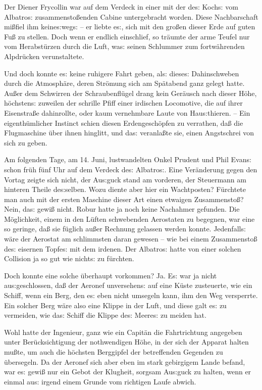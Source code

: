 \documentclass[oneside,12pt]{book}
\newcommand{\s}{s:}
\begin{document}
Der Diener Frycollin war auf dem Verdeck in einer mit der de{\s}
Koch{\s} vom {\glqq}Albatro{\s}{\grqq} zusammensto{\ss}enden Cabine
untergebracht worden. Diese Nachbarschaft mi{\ss}fiel ihm
keine{\s}weg{\s} -- er liebte e{\s}, sich mit den gro{\ss}en dieser
Erde auf guten Fu{\ss} zu stellen. Doch wenn er endlich einschlief,
so tr\"aumte der arme Teufel nur vom Herabst\"urzen durch die Luft,
wa{\s} seinen Schlummer zum fortw\"ahrenden Alpdr\"ucken
verunstaltete.

Und doch konnte e{\s} keine ruhigere Fahrt geben, al{\s} diese{\s}
Dahinschweben durch die Atmosph\"are, deren Str\"omung sich am
Sp\"atabend ganz gelegt hatte. Au{\ss}er dem Schwirren der
Schraubenfl\"ugel drang kein Ger\"ausch nach dieser H\"ohe,
h\"ochsten{\s} zuweilen der schrille Pfiff einer irdischen
Locomotive, die auf ihrer Eisenstra{\ss}e dahinrollte, oder kaum
vernehmbare Laute von Hau{\s}thieren. -- Ein eigenth\"umlicher
Instinct schien diesen Erdengesch\"opfen zu verrathen, da{\ss} die
Flugmaschine \"uber ihnen hinglitt, und da{\s} veranla{\ss}te sie,
einen Angstschrei von sich zu geben.

Am folgenden Tage, am 14. Juni, lustwandelten Onkel Prudent und Phil
Evan{\s} schon fr\"uh f\"unf Uhr auf dem Verdeck de{\s}
{\glqq}Albatro{\s}{\grqq}. Eine Ver\"anderung gegen den Vortag zeigte
sich nicht, der Au{\s}guck stand am vorderen, der Steuermann am
hinteren Theile de{\s}selben. Wozu diente aber hier ein Wachtposten?
F\"urchtete man auch mit der ersten Maschine dieser Art einen
etwaigen Zusammensto{\ss}? Nein, da{\s} gewi{\ss} nicht. Robur hatte
ja noch keine Nachahmer gefunden. Die M\"oglichkeit, einem in den
L\"uften schwebenden Aerostaten zu begegnen, war eine so geringe,
da{\ss} sie f\"uglich au{\ss}er Rechnung gelassen werden konnte.
Jedenfall{\s} w\"are der Aerostat am schlimmsten daran gewesen -- wie
bei einem Zusammensto{\ss} de{\s} eisernen Topfe{\s} mit dem irdenen.
Der {\glqq}Albatro{\s}{\grqq} hatte von einer solchen Collision ja so
gut wie nicht{\s} zu f\"urchten.

Doch konnte eine solche \"uberhaupt vorkommen? Ja. E{\s} war ja nicht
au{\s}geschlossen, da{\ss} der Aeronef unversehen{\s} auf eine
K\"uste zusteuerte, wie ein Schiff, wenn ein Berg, den e{\s} eben
nicht umsegeln kann, ihm den Weg versperrte. Ein solcher Berg w\"are
also eine Klippe in der Luft, und diese galt e{\s} zu vermeiden, wie
da{\s} Schiff die Klippe de{\s} Meere{\s} zu meiden hat.

Wohl hatte der Ingenieur, ganz wie ein Capit\"an die Fahrtrichtung
angegeben unter Ber\"uck\-sich\-tigung der nothwendigen H\"ohe, in der
sich der Apparat halten mu{\ss}te, um auch die h\"ochsten Berggipfel
der betreffenden Gegenden zu \"ubersegeln. Da der Aeronef sich aber
eben im stark gebirgigem Lande befand, war e{\s} gewi{\ss} nur ein
Gebot der Klugheit, sorgsam Au{\s}guck zu halten, wenn er einmal
au{\s} irgend einem Grunde vom richtigen Laufe abwich.
\end{document}
